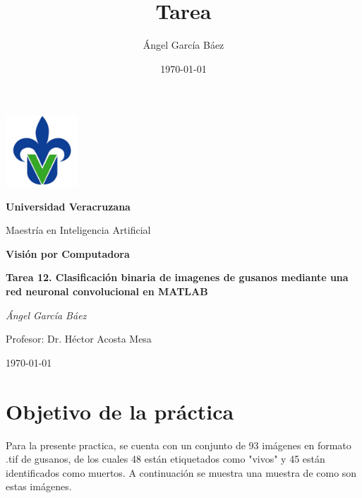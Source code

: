 \documentclass[11pt, letterpaper]{article}
\title{\bfseries Tarea}
\author{Ángel García Báez}
\date{\today}
\begin{document}
	
	\begin{titlepage}
		\centering
		\includegraphics[width=0.2\textwidth]{logo.png}\par
		\vspace{1cm}
		{\LARGE \bfseries Universidad Veracruzana \par}
		\vspace{1cm}
		{\Large Maestría en Inteligencia Artificial\par}
		\vspace{3cm}
		{\LARGE \bfseries Visión por Computadora \par}
		\vspace{1cm}
		{\Large \bfseries Tarea 12. Clasificación binaria de imagenes de gusanos mediante una red neuronal convolucional en MATLAB \par}
		\vfill
		{\Large \textit{Ángel García Báez}\par}
		\vspace{1cm}
		{\Large Profesor: Dr. Héctor Acosta Mesa \par}
		\vfill
		{\Large \today \par}
	\end{titlepage}
	
	\newpage
	\tableofcontents
	\newpage
	
\section{Objetivo de la práctica}

Para la presente practica, se cuenta con un conjunto de 93 imágenes en formato .tif de gusanos, de los cuales 48 están etiquetados como "vivos" y 45 están identificados como muertos. A continuación se muestra una muestra de como son estas imágenes.
\end{document}
